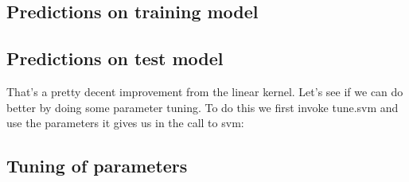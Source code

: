 \documentclass[]{book}
\newenvironment{Shaded}{\begin{snugshade}}{\end{snugshade}}
\newcommand{\CommentTok}[1]{\textcolor[rgb]{0.56,0.35,0.01}{\textit{#1}}}
\newcommand{\DataTypeTok}[1]{\textcolor[rgb]{0.13,0.29,0.53}{#1}}
\newcommand{\KeywordTok}[1]{\textcolor[rgb]{0.13,0.29,0.53}{\textbf{#1}}}
\newcommand{\NormalTok}[1]{#1}
\newcommand{\OperatorTok}[1]{\textcolor[rgb]{0.81,0.36,0.00}{\textbf{#1}}}
\newcommand{\StringTok}[1]{\textcolor[rgb]{0.31,0.60,0.02}{#1}}
\begin{document}
\hypertarget{predictions-on-training-model-2}{%
\subsection{Predictions on training model}\label{predictions-on-training-model-2}}

\begin{Shaded}
\end{Shaded}

\hypertarget{predictions-on-test-model-2}{%
\subsection{Predictions on test model}\label{predictions-on-test-model-2}}

\begin{Shaded}
\end{Shaded}

That's a pretty decent improvement from the linear kernel. Let's see if we can do better by doing some parameter tuning. To do this we first invoke tune.svm and use the parameters it gives us in the call to svm:

\hypertarget{tuning-of-parameters}{%
\subsection{Tuning of parameters}\label{tuning-of-parameters}}
\end{document}
